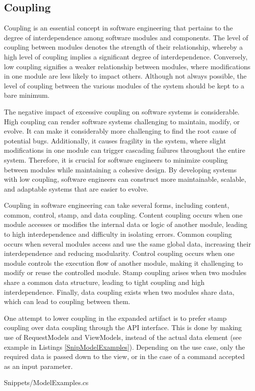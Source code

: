 \subsection{Coupling} \label{subsec:on_coupling}

Coupling is an essential concept in software engineering that pertains to the degree of
interdependence among software modules and components. The level of coupling between
modules denotes the strength of their relationship, whereby a high level of coupling
implies a significant degree of interdependence. Conversely, low coupling signifies a
weaker relationship between modules, where modifications in one module are less likely to
impact others. Although not always possible, the level of coupling between the various
modules of the system should be kept to a bare minimum.

The negative impact of excessive coupling on software systems is considerable. High
coupling can render software systems challenging to maintain, modify, or evolve. It can make
it considerably more challenging to find the root cause of potential bugs. Additionally, it
causes fragility in the system, where slight modifications in one module can trigger
cascading failures throughout the entire system. Therefore, it is crucial for software
engineers to minimize coupling between modules while maintaining a cohesive design. By
developing systems with low coupling, software engineers can construct more maintainable,
scalable, and adaptable systems that are easier to evolve.

Coupling in software engineering can take several forms, including content, common,
control, stamp, and data coupling. Content coupling occurs when one module accesses or
modifies the internal data or logic of another module, leading to high interdependence and
difficulty in isolating errors. Common coupling occurs when several modules access and use
the same global data, increasing their interdependence and reducing modularity. Control
coupling occurs when one module controls the execution flow of another module, making it
challenging to modify or reuse the controlled module. Stamp coupling arises when two modules
share a common data structure, leading to tight coupling and high interdependence.
Finally, data coupling exists when two modules share data, which can lead to coupling
between them.

One attempt to lower coupling in the expanded artifact is to prefer stamp coupling over
data coupling through the API interface. This is done by making use of RequestModels and
ViewModels, instead of the actual data element (see example in Listings \ref{SnipModelExamples}).
Depending on the use case, only the required data is passed down to the view, or in the
case of a command accepted as an input parameter.


    {Snippets/ModelExamples.cs}